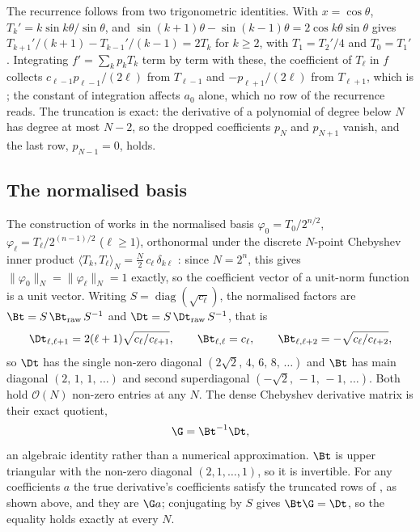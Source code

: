 The recurrence follows from two trigonometric identities. With $x=\cos\theta$, $T_k'=k\sin k\theta/\sin\theta$, and $\sin(k+1)\theta-\sin(k-1)\theta=2\cos k\theta\sin\theta$ gives $T_{k+1}'/(k+1)-T_{k-1}'/(k-1)=2T_k$ for $k\ge2$, with $T_1=T_2'/4$ and $T_0=T_1'$. Integrating $f'=\sum_kp_kT_k$ term by term with these, the coefficient of $T_\ell$ in $f$ collects $c_{\ell-1}p_{\ell-1}/(2\ell)$ from $T_{\ell-1}$ and $-p_{\ell+1}/(2\ell)$ from $T_{\ell+1}$, which is ; the constant of integration affects $a_0$ alone, which no row of the recurrence reads. The truncation is exact: the derivative of a polynomial of degree below $N$ has degree at most $N-2$, so the dropped coefficients $p_N$ and $p_{N+1}$ vanish, and the last row, $p_{N-1}=0$, holds.

\subsection{The normalised basis}

The construction of  works in the normalised basis
$\varphi_0 = T_0 / 2^{n/2}$, $\varphi_\ell = T_\ell / 2^{(n-1)/2}$ ($\ell \ge 1$), orthonormal
under the discrete $N$-point Chebyshev inner product $\langle T_k, T_\ell \rangle_N =
\tfrac{N}{2}\,c_\ell\,\delta_{k\ell}$ \cite{trefethen2000spectral}: since $N = 2^n$, this gives
$\|\varphi_0\|_N = \|\varphi_\ell\|_N = 1$ exactly, so the coefficient vector of a unit-norm
function is a unit vector. Writing
$S = \operatorname{diag}(\sqrt{c_\ell})$, the normalised factors are
$\Bt = S\,\Bt_{\mathrm{raw}}\,S^{-1}$ and
$\Dt = S\,\Dt_{\mathrm{raw}}\,S^{-1}$, that is
\begin{equation}
    \Dt_{\ell,\ell+1} = 2(\ell+1)\sqrt{c_\ell / c_{\ell+1}} , \qquad
    \Bt_{\ell,\ell} = c_\ell , \qquad
    \Bt_{\ell,\ell+2} = -\sqrt{c_\ell / c_{\ell+2}} ,
    \label{eq:app-normalised-entries}
\end{equation}
so $\Dt$ has the single non-zero diagonal $(2\sqrt{2},\, 4,\, 6,\, 8,\, \dots)$
and $\Bt$ has main diagonal $(2,\, 1,\, 1,\, \dots)$ and second superdiagonal
$(-\sqrt{2},\, -1,\, -1,\, \dots)$. Both hold $\mathcal{O}(N)$ non-zero entries at
any $N$. The dense Chebyshev derivative matrix is their exact quotient,
\begin{equation}
    \G = \Bt^{-1}\Dt ,
\end{equation}
an algebraic identity rather than a numerical approximation. $\Bt$ is upper triangular with the non-zero diagonal $(2,1,\dots,1)$, so it is invertible. For any coefficients $a$ the true derivative's coefficients satisfy the truncated rows of , as shown above, and they are $\G a$; conjugating by $S$ gives $\Bt\G=\Dt$, so the equality holds exactly at every $N$.


